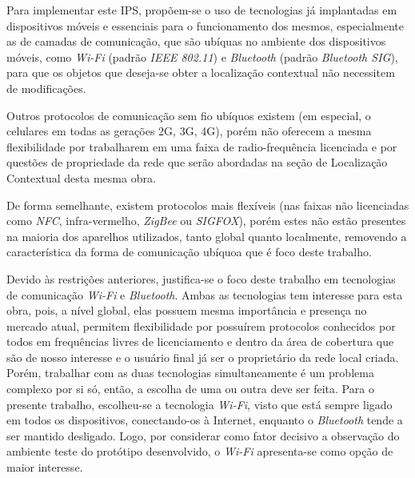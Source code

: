 Para implementar este IPS, propõem-se o uso de tecnologias já implantadas em
dispositivos móveis e essenciais para o funcionamento dos mesmos, especialmente
as de camadas de comunicação, que são ubíquas no ambiente dos dispositivos
móveis, como \emph{Wi-Fi} (padrão \emph{IEEE 802.11}) e \emph{Bluetooth}
(padrão \emph{Bluetooth SIG}), para que os objetos que deseja-se obter a localização
contextual não necessitem de modificações.

Outros protocolos de comunicação sem fio ubíquos existem (em especial, o
celulares em todas as gerações 2G, 3G, 4G), porém não oferecem a mesma
flexibilidade por trabalharem em uma faixa de radio-frequência licenciada e por
questões de propriedade da rede que serão abordadas na seção de Localização
Contextual desta mesma obra.

De forma semelhante, existem protocolos mais flexíveis (nas faixas não
licenciadas como \emph{NFC}, infra-vermelho, \emph{ZigBee} ou
\emph{SIGFOX}), porém estes não estão presentes na maioria dos aparelhos
utilizados, tanto global quanto localmente, removendo a característica da
forma de comunicação ubíquoa que é foco deste trabalho.

Devido às restrições anteriores, justifica-se o foco deste trabalho em tecnologias de
comunicação \emph{Wi-Fi} e \emph{Bluetooth}. Ambas as tecnologias
tem interesse para esta obra, pois, a nível global, elas possuem mesma importância e presença no mercado atual, permitem
flexibilidade por possuírem protocolos conhecidos por todos em frequências
livres de licenciamento e dentro da área de cobertura que são de nosso interesse
e o usuário final já ser o proprietário da rede local criada. Porém, trabalhar com as duas
tecnologias simultaneamente é um problema complexo por si só, então, a escolha
de uma ou outra deve ser feita. Para o presente trabalho, escolheu-se a tecnologia \emph{Wi-Fi}, visto que está sempre
ligado em todos os dispositivos, conectando-os à Internet, enquanto o \emph{Bluetooth} tende
a ser mantido desligado. Logo, por considerar como fator decisivo a observação do ambiente teste do protótipo
desenvolvido, o \emph{Wi-Fi} apresenta-se como opção de maior interesse.
